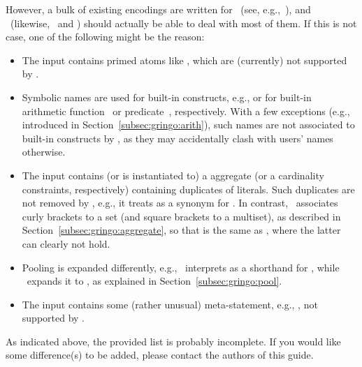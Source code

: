 However, a bulk of existing encodings are written for \lparse\
(see, e.g.,~\cite{asparagus}),
and \gringo\ (likewise, \clingo\ and \iclingo) should actually be able to deal with most of them.
If this is not case, one of the following might be the reason:
%
\begin{itemize}
\item
The input contains primed atoms like , which are (currently) not supported by \gringo.
\item
Symbolic names are used for built-in constructs, e.g.,  or 
for built-in arithmetic function~\code{+} or predicate~\code{==}, respectively.
With a few exceptions (e.g., \const{abs} introduced in Section~\ref{subsec:gringo:arith}),
such names are not associated to built-in constructs by \gringo,
as they may accidentally clash with users' names otherwise.
\item
The input contains (or is instantiated to) 
a  aggregate (or a cardinality constraints, respectively)
containing duplicates of literals.
Such duplicates are not removed by \lparse, e.g.,
it treats 
as a synonym for \code{2[\pred{p}(\const{c})=1,\pred{p}(\const{c})=1]}.
In contrast, \gringo\ associates curly brackets to a set
(and square brackets to a multiset), as described in Section~\ref{subsec:gringo:aggregate}, so that
\code{2\char`\{\pred{p}(\const{c}),\pred{p}(\const{c})\char`\}} is the same as
\code{2\char`\{\pred{p}(\const{c})\char`\}},
where the latter can clearly not hold.
\item
Pooling is expanded differently,
e.g.,
\lparse\ interprets
as a shorthand for
,
while \gringo\ expands it to
,
as explained in Section~\ref{subsec:gringo:pool}.
\item
The input contains some (rather unusual) meta-statement, e.g.,
, not supported by \gringo.
\end{itemize}
%
As indicated above, the provided list is probably incomplete.
If you would like some difference(s) to be added,
please contact the authors of this guide.


